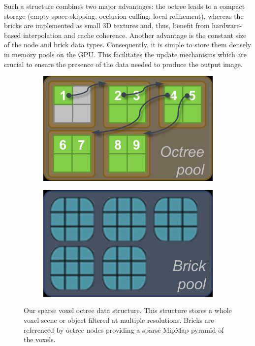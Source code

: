 Such a structure combines two major advantages: the octree leads to a compact storage (empty space skipping, occlusion culling, local refinement), whereas the bricks are implemented as small 3D textures and, thus, benefit from hardware-based interpolation and cache coherence. Another advantage is the constant size of the node and brick data types. Consequently, it is simple to store them densely in memory pools on the GPU. This facilitates the update mechanisms which are crucial to ensure the presence of the data needed to produce the output image.

\begin{figure}\label{f:vct-gpu-representation}
\begin{center}
	\begin{subfigure}[b]{0.4\textwidth}
		\includegraphics{graphics/vct/vct-13-8}
	\end{subfigure}
	\begin{subfigure}[b]{0.4\textwidth}
		\includegraphics{graphics/vct/vct-13-9}
	\end{subfigure}
\end{center}
	\caption{Our sparse voxel octree data structure. This structure stores a whole voxel scene or object filtered at multiple resolutions. Bricks are referenced by octree nodes providing a sparse MipMap pyramid of the voxels.}
\end{figure}




